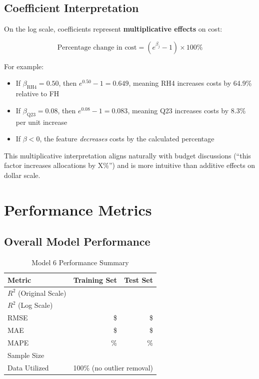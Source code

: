 \subsection{Coefficient Interpretation}

On the log scale, coefficients represent \textbf{multiplicative effects} on cost:

\begin{equation}
\text{Percentage change in cost} = (e^{\beta_j} - 1) \times 100\%
\end{equation}

For example:
\begin{itemize}
    \item If $\beta_{\text{RH4}} = 0.50$, then $e^{0.50} - 1 = 0.649$, meaning RH4 increases costs by 64.9\% relative to FH
    \item If $\beta_{\text{Q23}} = 0.08$, then $e^{0.08} - 1 = 0.083$, meaning Q23 increases costs by 8.3\% per unit increase
    \item If $\beta < 0$, the feature \textit{decreases} costs by the calculated percentage
\end{itemize}

This multiplicative interpretation aligns naturally with budget discussions (``this factor increases allocations by X\%'') and is more intuitive than additive effects on dollar scale.

\section{Performance Metrics}

\subsection{Overall Model Performance}

\begin{table}[h]
\centering
\caption{Model 6 Performance Summary}
\begin{tabular}{lrr}
\toprule
\textbf{Metric} & \textbf{Training Set} & \textbf{Test Set} \\
\midrule
$R^2$ (Original Scale) & \ModelSixRSquaredTrain{} & \ModelSixRSquaredTest{} \\
$R^2$ (Log Scale) & \multicolumn{2}{c}{\ModelSixRSquaredLogScale{}} \\
RMSE & \$\ModelSixRMSETrain{} & \$\ModelSixRMSETest{} \\
MAE & \$\ModelSixMAETrain{} & \$\ModelSixMAETest{} \\
MAPE & \ModelSixMAPETrain{}\% & \ModelSixMAPETest{}\% \\
Sample Size & \ModelSixTrainingSamples{} & \ModelSixTestSamples{} \\
\midrule
Data Utilized & \multicolumn{2}{c}{100\% (no outlier removal)} \\
\bottomrule
\end{tabular}
\end{table}

